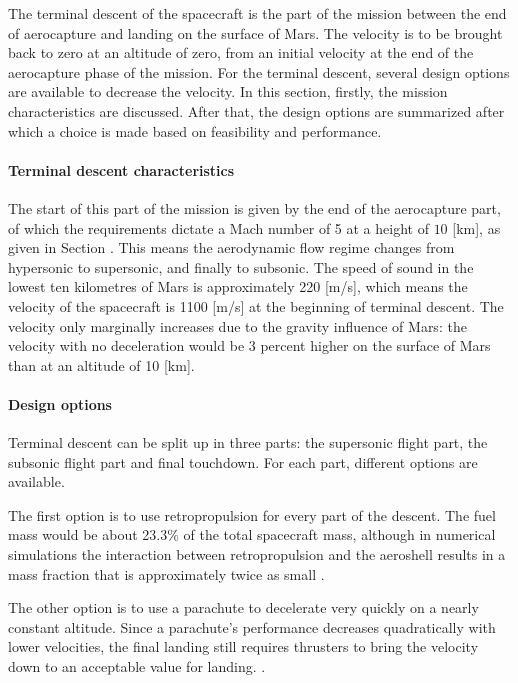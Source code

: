 The terminal descent of the spacecraft is the part of the mission between the end of aerocapture and landing on the surface of Mars. The velocity is to be brought back to zero at an altitude of zero, from an initial velocity at the end of the aerocapture phase of the mission. For the terminal descent, several design options are available to decrease the velocity. In this section, firstly, the mission characteristics are discussed. After that, the design options are summarized after which a choice is made based on feasibility and performance.

\paragraph{Terminal descent characteristics}
The start of this part of the mission is given by the end of the aerocapture part, of which the requirements dictate a Mach number of 5 at a height of $10$ [km], as given in Section \label{sec:missionreq}. This means the aerodynamic flow regime changes from hypersonic to supersonic, and finally to subsonic. The speed of sound in the lowest ten kilometres of Mars is approximately 220 [m/s], which means the velocity of the spacecraft is 1100 [m/s] at the beginning of terminal descent. The velocity only marginally increases due to the gravity influence of Mars: the velocity with no deceleration would be 3 percent higher on the surface of Mars than at an altitude of 10 [km].

\paragraph{Design options}
Terminal descent can be split up in three parts: the supersonic flight part, the subsonic flight part and final touchdown. For each part, different options are available.

The first option is to use retropropulsion for every part of the descent. The fuel mass would be about 23.3$\%$ of the total spacecraft mass, although in numerical simulations the interaction between retropropulsion and the aeroshell results in a mass fraction that is approximately twice as small \cite{Korzun2009a}.

The other option is to use a parachute to decelerate very quickly on a nearly constant altitude. Since a parachute's performance decreases quadratically with lower velocities, the final landing still requires thrusters to bring the velocity down to an acceptable value for landing. \cite{Braun2007}.